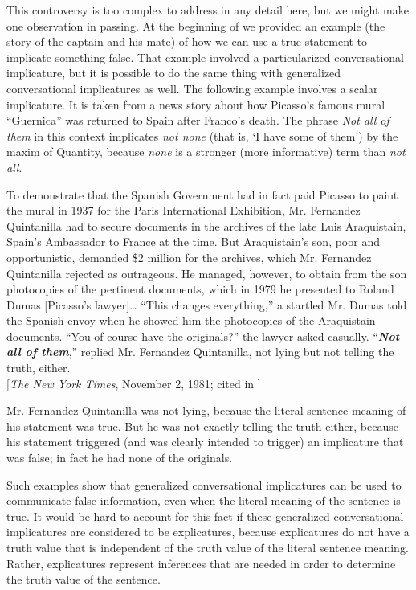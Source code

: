 This controversy is too complex to address in any detail here, but we might make one observation in passing. At the beginning of  we provided an example (the story of the captain and his mate) of how we can use a true statement to implicate something false. That example involved a particularized conversational implicature, but it is possible to do the same thing with generalized conversational implicatures as well. The following example involves a scalar implicature. It is taken from a news story about how Picasso’s famous mural “Guernica” was returned to Spain after Franco’s death. The phrase \textit{Not all of them} in this context implicates \textit{not none} (that is, ‘I have some of them’) by the maxim of Quantity, because \textit{none} is a stronger (more informative) term than \textit{not all}.


\ea \label{ex:9.22}
  To demonstrate that the Spanish Government had in fact paid Picasso to paint the mural in 1937 for the Paris International Exhibition, Mr. Fernandez Quintanilla had to secure documents in the archives of the late Luis Araquistain, Spain’s Ambassador to France at the time. But Araquistain’s son, poor and opportunistic, demanded \$2 million for the archives, which Mr. Fernandez Quintanilla rejected as outrageous. He managed, however, to obtain from the son photocopies of the pertinent documents, which in 1979 he presented to Roland Dumas [Picasso’s lawyer]… “This changes everything,” a startled Mr. Dumas told the Spanish envoy when he showed him the photocopies of the Araquistain documents. “You of course have the originals?” the lawyer asked casually. “\textbf{\textit{Not all of them}},” replied Mr. Fernandez Quintanilla, not lying but not telling the truth, either.\\
   {}[\textit{The New York Times}, November 2, 1981; cited in \citealt{Horn1992}]
\z


Mr. Fernandez Quintanilla was not lying, because the literal sentence meaning of his statement was true. But he was not exactly telling the truth either, because his statement triggered (and was clearly intended to trigger) an implicature that was false; in fact he had none of the originals.



Such examples show that generalized conversational implicatures can be used to communicate false information, even when the literal meaning of the sentence is true. It would be hard to account for this fact if these generalized conversational implicatures are considered to be explicatures, because explicatures do not have a truth value that is independent of the truth value of the literal sentence meaning. Rather, explicatures represent inferences that are needed in order to determine the truth value of the sentence.


